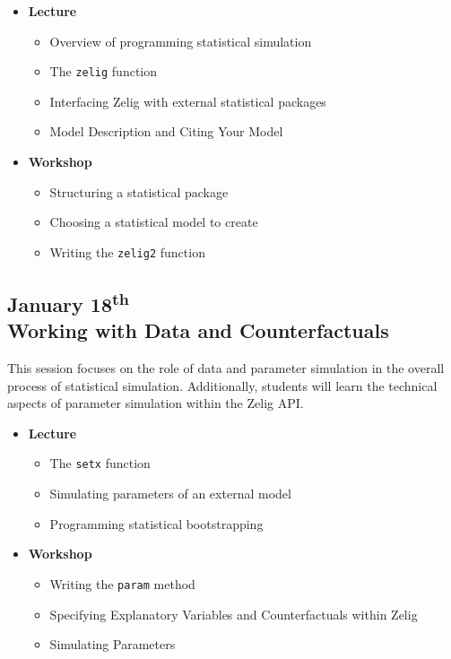 \documentclass{article}
\begin{document}
\begin{itemize}

  \item {\bf Lecture}
    \begin{itemize}
      \item Overview of programming statistical simulation
      \item The {\tt zelig} function
      \item Interfacing Zelig with external statistical packages
      \item Model Description and Citing Your Model
    \end{itemize}
    
  \item {\bf Workshop}
    \begin{itemize}
      \item Structuring a statistical package
      \item Choosing a statistical model to create
      \item Writing the {\tt zelig2} function
    \end{itemize}

\end{itemize}



\subsection{January 18\textsuperscript{th} \\ Working with Data and
Counterfactuals}

This session focuses on the role of data and parameter simulation in the overall
process of statistical simulation. Additionally, students will learn the
technical aspects of parameter simulation within the Zelig API.

\begin{itemize}

  \item {\bf Lecture}
    \begin{itemize}
      \item The {\tt setx} function
      \item Simulating parameters of an external model
      \item Programming statistical bootstrapping
    \end{itemize}

  \item {\bf Workshop}
    \begin{itemize}
      \item Writing the {\tt param} method
      \item Specifying Explanatory Variables and Counterfactuals within Zelig
      \item Simulating Parameters
    \end{itemize}

\end{itemize}
\end{document}
